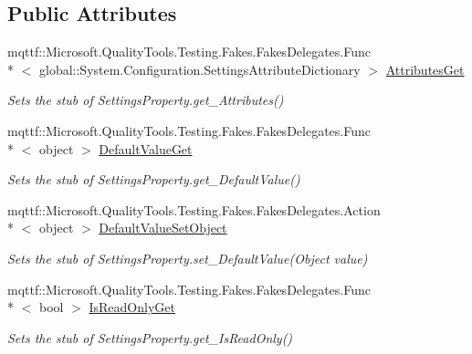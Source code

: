 \subsection*{Public Attributes}
\begin{DoxyCompactItemize}
\item 
mqttf\-::\-Microsoft.\-Quality\-Tools.\-Testing.\-Fakes.\-Fakes\-Delegates.\-Func\\*
$<$ global\-::\-System.\-Configuration.\-Settings\-Attribute\-Dictionary $>$ \hyperlink{class_system_1_1_configuration_1_1_fakes_1_1_stub_settings_property_af0a78eea4533b9cebd90c27ba0746d65}{Attributes\-Get}
\begin{DoxyCompactList}\small\item\em Sets the stub of Settings\-Property.\-get\-\_\-\-Attributes()\end{DoxyCompactList}\item 
mqttf\-::\-Microsoft.\-Quality\-Tools.\-Testing.\-Fakes.\-Fakes\-Delegates.\-Func\\*
$<$ object $>$ \hyperlink{class_system_1_1_configuration_1_1_fakes_1_1_stub_settings_property_a0f8b91c81a312617dc202c6cdcb1e242}{Default\-Value\-Get}
\begin{DoxyCompactList}\small\item\em Sets the stub of Settings\-Property.\-get\-\_\-\-Default\-Value()\end{DoxyCompactList}\item 
mqttf\-::\-Microsoft.\-Quality\-Tools.\-Testing.\-Fakes.\-Fakes\-Delegates.\-Action\\*
$<$ object $>$ \hyperlink{class_system_1_1_configuration_1_1_fakes_1_1_stub_settings_property_abf802041bdbb8fb209b928c41c462f81}{Default\-Value\-Set\-Object}
\begin{DoxyCompactList}\small\item\em Sets the stub of Settings\-Property.\-set\-\_\-\-Default\-Value(\-Object value)\end{DoxyCompactList}\item 
mqttf\-::\-Microsoft.\-Quality\-Tools.\-Testing.\-Fakes.\-Fakes\-Delegates.\-Func\\*
$<$ bool $>$ \hyperlink{class_system_1_1_configuration_1_1_fakes_1_1_stub_settings_property_a4ba09429c507b76cd6b8a3077ed21db3}{Is\-Read\-Only\-Get}
\begin{DoxyCompactList}\small\item\em Sets the stub of Settings\-Property.\-get\-\_\-\-Is\-Read\-Only()\end{DoxyCompactList}\item 

\end{DoxyCompactItemize}
